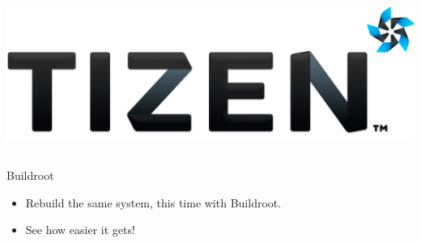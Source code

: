 \begin{frame}
\begin{columns}
    \includegraphics[width=\textwidth]{slides/sysdev-embedded-linux/tizen.png}\\
  \end{columns}
\end{frame}

\setuplabframe
{Buildroot}
{
  \begin{itemize}
  \item Rebuild the same system, this time with Buildroot.
  \item See how easier it gets!
  \end{itemize}
}

